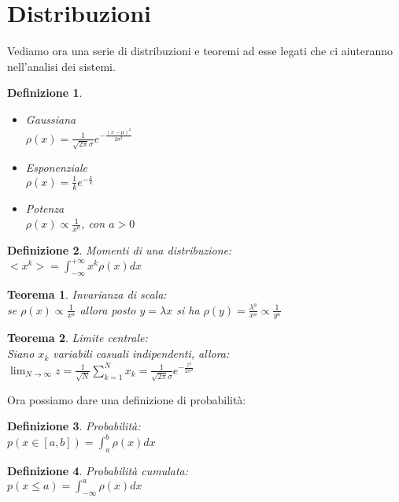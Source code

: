 \documentclass[12pt, a4paper]{article}
\theoremstyle{theorem}
\newtheorem{definition}{Definizione}[section]
\newtheorem{theorem}{Teorema}[section]
\begin{document}
	\section{Distribuzioni}
		Vediamo ora una serie di distribuzioni e teoremi ad esse legati che ci aiuteranno nell'analisi dei sistemi.
		\begin{definition}\hfill
			\begin{itemize}
				\item Gaussiana\\	$\rho(x)=\frac{1}{\sqrt{2\pi}\sigma}e^{-\frac{(x-\mu)^2}{2\sigma^2}}$
				\item Esponenziale\\	$\rho(x)=\frac{1}{k}e^{-\frac{x}{k}}$
				\item Potenza\\		$\rho(x)\propto\frac{1}{x^a}$, con $a>0$
			\end{itemize}
		\end{definition}
		\begin{definition}
			Momenti di una distribuzione:\\
			$<x^k>=\int_{-\infty}^{+\infty}x^k\rho(x)dx$
		\end{definition}
		\begin{theorem}
			Invarianza di scala:\\
			se $\rho(x)\propto\frac{1}{x^a}$ allora posto $y=\lambda x$ si ha $\rho(y)=\frac{\lambda^a}{x^a}\propto\frac{1}{y^a}$
		\end{theorem}
		\begin{theorem}
			Limite centrale:\\
			Siano ${x_k}$ variabili casuali indipendenti, allora:\\
			$\lim_{N\to\infty}z=\frac{1}{\sqrt{N}}\sum_{k=1}^{N}x_k=\frac{1}{\sqrt{2\pi}\sigma}e^{-\frac{z^2}{2\sigma^2}}$
		\end{theorem}
		Ora possiamo dare una definizione di probabilità:
		\begin{definition} Probabilità:\\
			$p(x\in[a,b])=\int_{a}^{b}\rho(x)dx$
		\end{definition}
		\begin{definition} Probabilità cumulata:\\
			$p(x\leq a)=\int_{-\infty}^{a}\rho(x)dx$
		\end{definition}
\end{document}
